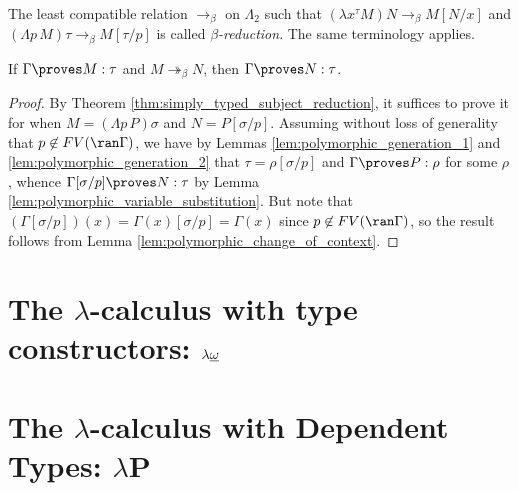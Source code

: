\documentclass[reqno]{amsart}
\begin{document}
    \begin{definition}
        The least compatible relation $\rightarrow_\beta$ on $\Lambda_2$ such that $(\lambda x^\tau M)N\rightarrow_\beta M[N/x]$ and $(\Lambda p\,M)\tau\rightarrow_\beta M[\tau/p]$ is called \textit{$\beta$-reduction}. The same terminology applies.
    \end{definition}

    \begin{theorem}\label{thm:polymorphic_subject_reduction}
        If $\Gamma\proves M:\tau$ and $M\twoheadrightarrow_\beta N$, then $\Gamma\proves N:\tau$.
    \end{theorem}
    \begin{proof}
        By Theorem \ref{thm:simply_typed_subject_reduction}, it suffices to prove it for when $M=(\Lambda p\,P)\sigma$ and $N=P[\sigma/p]$. Assuming without loss of generality that $p\not\in FV(\ran\Gamma)$, we have by Lemmas \ref{lem:polymorphic_generation_1} and \ref{lem:polymorphic_generation_2} that $\tau=\rho[\sigma/p]$ and $\Gamma\proves P:\rho$ for some $\rho$, whence $\Gamma[\sigma/p]\proves N:\tau$ by Lemma \ref{lem:polymorphic_variable_substitution}. But note that $(\Gamma[\sigma/p])(x)=\Gamma(x)[\sigma/p]=\Gamma(x)$ since $p\not\in FV(\ran\Gamma)$, so the result follows from Lemma \ref{lem:polymorphic_change_of_context}. 
    \end{proof}

    \section{The $\lambda$-calculus with type constructors: $\lambda\uline{\omega}$}

    \begin{definition}
        
    \end{definition}

    \begin{lemma}
        
    \end{lemma}

    \begin{theorem}

    \end{theorem}

    \section{The $\lambda$-calculus with Dependent Types: $\lambda\mathbf{P}$}
\end{document}
